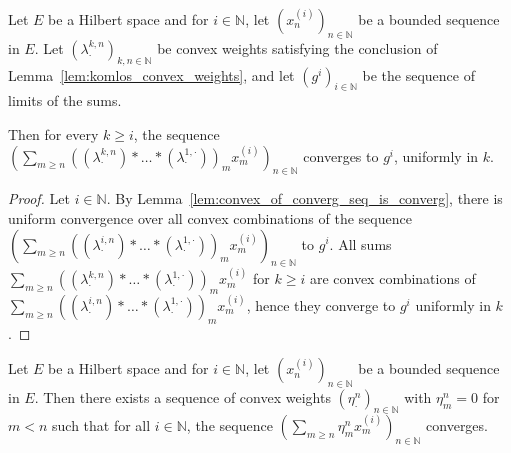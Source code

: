 \begin{lemma}\label{lem:komlos_convex_weights_tendsto}
  \leanok
Let $E$ be a Hilbert space and for $i \in \mathbb{N}$, let $(x_n^{(i)})_{n \in \mathbb{N}}$ be a bounded sequence in $E$.
Let $(\lambda^{k,n}_\cdot)_{k, n \in \mathbb{N}}$ be convex weights satisfying the conclusion of Lemma~\ref{lem:komlos_convex_weights}, and let $(g^i)_{i\in \mathbb{N}}$ be the sequence of limits of the sums.

Then for every $k \ge i$, the sequence $\left(\sum_{m \ge n} \left((\lambda^{k,n}_\cdot) * \ldots * (\lambda^{1,\cdot}_\cdot)\right)_m x_m^{(i)}\right)_{n \in \mathbb{N}}$ converges to $g^i$, uniformly in $k$.
\end{lemma}

\begin{proof} \leanok
Let $i \in \mathbb{N}$.
By Lemma~\ref{lem:convex_of_converg_seq_is_converg}, there is uniform convergence over all convex combinations of the sequence $\left(\sum_{m \ge n} \left((\lambda^{i,n}_\cdot) * \ldots * (\lambda^{1,\cdot}_\cdot)\right)_m x_m^{(i)}\right)_{n \in \mathbb{N}}$ to $g^i$.
All sums $\sum_{m \ge n} \left((\lambda^{k,n}_\cdot) * \ldots * (\lambda^{1,\cdot}_\cdot)\right)_m x_m^{(i)}$ for $k \ge i$ are convex combinations of $\sum_{m \ge n} \left((\lambda^{i,n}_\cdot) * \ldots * (\lambda^{1,\cdot}_\cdot)\right)_m x_m^{(i)}$, hence they converge to $g^i$ uniformly in $k$.
\end{proof}


\begin{lemma}\label{lem:komlos_convex_weights_diagonal}
  \leanok
Let $E$ be a Hilbert space and for $i \in \mathbb{N}$, let $(x_n^{(i)})_{n \in \mathbb{N}}$ be a bounded sequence in $E$.
Then there exists a sequence of convex weights $(\eta^n_\cdot)_{n \in \mathbb{N}}$ with $\eta^n_m = 0$ for $m < n$ such that for all $i \in \mathbb{N}$, the sequence $\left(\sum_{m \ge n} \eta^n_m x_m^{(i)}\right)_{n \in \mathbb{N}}$ converges.
\end{lemma}

